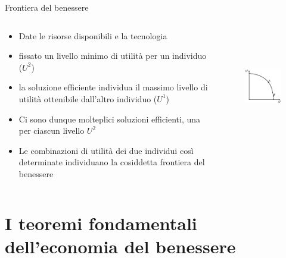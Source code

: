 \documentclass[aspectratio=64,11pt]{beamer}
\begin{document}
\begin{frame}{Frontiera del benessere}
\begin{columns}
\begin{column}{.5\columnwidth}
\begin{itemize}
\item Date le risorse disponibili e la tecnologia
\item fissato un livello minimo di utilità per un individuo ($U^2$)
\item la soluzione efficiente individua il massimo livello di utilità ottenibile dall’altro individuo ($U^1$)
\item Ci sono dunque molteplici soluzioni efficienti, una per ciascun livello $U^2$
\item Le combinazioni di utilità dei due individui così determinate individuano la cosiddetta \alert{frontiera del benessere}
\end{itemize}
\end{column}
\begin{column}{.5\columnwidth}
\begin{figure}[htbp]
\centering
\includegraphics[height=5cm]{./figure/frontiere-2.pdf}
\end{figure}
\end{column}
\end{columns}
\end{frame}

\section{I teoremi fondamentali dell'economia del benessere}
\end{document}
